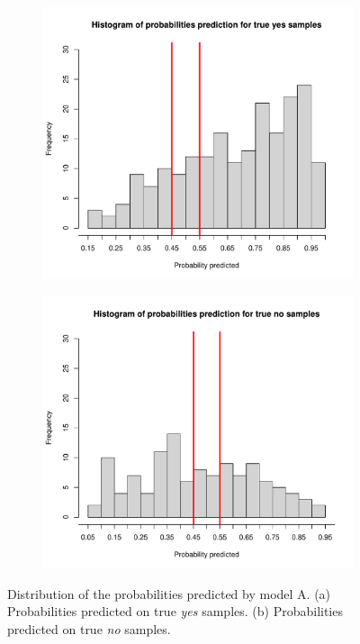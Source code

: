 \begin{figure}[H]
	\begin{subfigure}{.5\textwidth}
		\centering
		\includegraphics[width=0.7\linewidth]{ImageFiles/Classification/LogReg/probability_pred_all_yes}
		\caption{}
		\label{fig:ProbPredYesA}
	\end{subfigure}
	\begin{subfigure}{.5\textwidth}
		\centering
		\includegraphics[width=0.7\linewidth]{ImageFiles/Classification/LogReg/probability_pred_all_no}
		\caption{}
		\label{fig:ProbPredNoA}
	\end{subfigure}
	\caption{Distribution of the probabilities predicted by model A. (a) Probabilities predicted on true \textit{yes} samples. (b) Probabilities predicted on true \textit{no} samples.}
	\label{fig:ProbPredA}
\end{figure}

